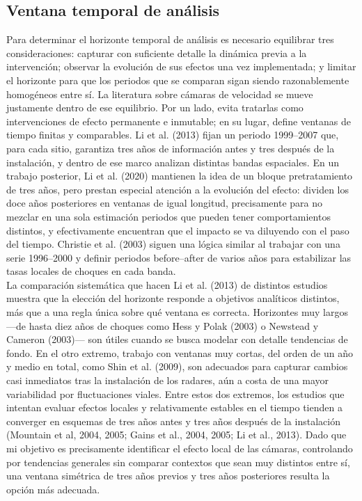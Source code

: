 \subsection{Ventana temporal de análisis}
\noindent Para determinar el horizonte temporal de análisis es necesario equilibrar tres consideraciones: capturar con suficiente detalle la dinámica previa a la intervención; observar la evolución de sus efectos una vez implementada; y limitar el horizonte para que los periodos que se comparan sigan siendo razonablemente homogéneos entre sí. La literatura sobre cámaras de velocidad se mueve justamente dentro de ese equilibrio. Por un lado, evita tratarlas como intervenciones de efecto permanente e inmutable; en su lugar, define ventanas de tiempo finitas y comparables. Li et al. (2013) fijan un periodo 1999–2007 que, para cada sitio, garantiza tres años de información antes y tres después de la instalación, y dentro de ese marco analizan distintas bandas espaciales. En un trabajo posterior, Li et al. (2020) mantienen la idea de un bloque pretratamiento de tres años, pero prestan especial atención a la evolución del efecto: dividen los doce años posteriores en ventanas de igual longitud, precisamente para no mezclar en una sola estimación periodos que pueden tener comportamientos distintos, y efectivamente encuentran que el impacto se va diluyendo con el paso del tiempo. Christie et al. (2003) siguen una lógica similar al trabajar con una serie 1996–2000 y definir periodos before–after de varios años para estabilizar las tasas locales de choques en cada banda.\\

La comparación sistemática que hacen Li et al. (2013) de distintos estudios muestra que la elección del horizonte responde a objetivos analíticos distintos, más que a una regla única sobre qué ventana es correcta. Horizontes muy largos ---de hasta diez años de choques como Hess y Polak (2003) o Newstead y Cameron (2003)--- son útiles cuando se busca modelar con detalle tendencias de fondo. En el otro extremo, trabajo con ventanas muy cortas, del orden de un año y medio en total, como Shin et al. (2009), son adecuados para capturar cambios casi inmediatos tras la instalación de los radares, aún a costa de una mayor variabilidad por fluctuaciones viales. Entre estos dos extremos, los estudios que intentan evaluar efectos locales y relativamente estables en el tiempo tienden a converger en esquemas de tres años antes y tres años después de la instalación (Mountain et al, 2004, 2005; Gains et al., 2004, 2005; Li et al., 2013). Dado que mi objetivo es precisamente identificar el efecto local de las cámaras, controlando por tendencias generales sin comparar contextos que sean muy distintos entre sí, una ventana simétrica de tres años previos y tres años posteriores resulta la opción más adecuada.

